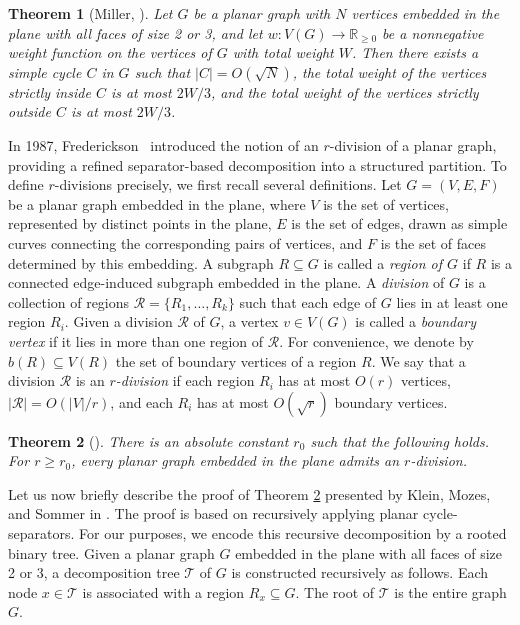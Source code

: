 \documentclass[11pt]{article}
\theoremstyle{plain}
\newtheorem{theorem}{Theorem}[section]
\theoremstyle{definition}
\theoremstyle{remark}
\begin{document}
\begin{theorem}[Miller, \cite{Miller1986}]\label{cycle}
Let $G$ be a planar graph with $N$ vertices embedded in the plane with all faces of size 2 or 3, and let $w : V(G) \to \mathbb{R}_{\ge 0}$ be a nonnegative weight function on the vertices of $G$ with total weight $W$. Then there exists a simple cycle $C$ in $G$ such that $|C| = O(\sqrt{N})$, the  total weight of the vertices strictly inside $C$ is at most $2W/3$, and the total weight of the vertices strictly outside $C$ is at most $2W/3$.
 \end{theorem}






In 1987, Frederickson~\cite{Fre87} introduced the notion of an \(r\)-division of a planar graph, providing a refined separator-based decomposition into a structured partition.
To define \(r\)-divisions precisely, we first recall several definitions.  Let \(G=(V,E,F)\) be a planar graph embedded in the plane, where \(V\) is the set of vertices, represented by distinct points in the plane, \(E\) is the set of edges, drawn as simple curves connecting the corresponding pairs of vertices, and \(F\) is the set of faces determined by this embedding.
A subgraph \(R\subseteq G\) is called a \emph{region of \(G\)} if \(R\) is a connected edge-induced subgraph embedded in the plane.
A \emph{division} of \(G\) is a collection of regions \(\mathcal R=\{R_1,\dots,R_k\}\) such that each edge of \(G\) lies in at least one region \(R_i\).
Given a division \(\mathcal R\) of \(G\), a vertex \(v\in V(G)\) is called a \emph{boundary vertex} if it lies in more than one region of \(\mathcal R\).
For convenience, we denote by \(b(R)\subseteq V(R)\) the set of boundary vertices of a region \(R\).
We say that a division \(\mathcal R\) is an \emph{\(r\)-division} if each region \(R_i\) has at most \(O(r)\) vertices, \(|\mathcal R| = O(|V|/r)\), and each \(R_i\) has at most \(O(\sqrt r)\) boundary vertices.







\begin{theorem}[\cite{Fre87}]\label{fred}
    There is an absolute constant $r_0$ such that the following holds.  For $r\geq r_0$, every planar graph embedded in the plane admits an $r$-division.
\end{theorem}
Let us now briefly describe the proof of Theorem \ref{fred} presented by Klein, Mozes, and Sommer in \cite{KMS13}.  The proof is based on recursively applying planar cycle-separators.  For our purposes, we encode this recursive decomposition by a rooted binary tree.  Given a planar graph $G$ embedded in the plane with all faces of size 2 or 3, a decomposition tree $\mathcal T$ of $G$ is constructed recursively as follows.
Each node \(x\in\mathcal T\) is associated with a region \(R_x\subseteq G\).  
The root of \(\mathcal T\) is the entire graph \(G\).  
\end{document}
